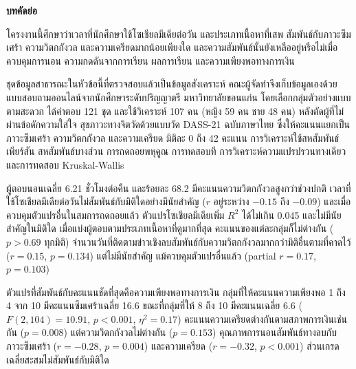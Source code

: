 \thispagestyle{empty}

\begin{center}
    {\fontsize{16pt}{20pt}\selectfont\bfseries บทคัดย่อ\par}
\end{center}

\vspace{1em}


โครงงานนี้ศึกษาว่าเวลาที่นักศึกษาใช้โซเชียลมีเดียต่อวัน และประเภทเนื้อหาที่เสพ
สัมพันธ์กับภาวะซึมเศร้า ความวิตกกังวล และความเครียดมากน้อยเพียงใด
และความสัมพันธ์นั้นยังเหลืออยู่หรือไม่เมื่อควบคุมการนอน ความกดดันจากการเรียน
ผลการเรียน และความเพียงพอทางการเงิน

ชุดข้อมูลสาธารณะในหัวข้อนี้ที่ตรวจสอบแล้วเป็นข้อมูลสังเคราะห์
คณะผู้จัดทำจึงเก็บข้อมูลเองด้วยแบบสอบถามออนไลน์จากนักศึกษาระดับปริญญาตรี มหาวิทยาลัยขอนแก่น
โดยเลือกกลุ่มตัวอย่างแบบตามสะดวก ได้คำตอบ 121 ชุด
และใช้วิเคราะห์ 107 คน (หญิง 59 คน ชาย 48 คน) หลังตัดผู้ที่ไม่ผ่านข้อดักความใส่ใจ
สุขภาวะทางจิตวัดด้วยแบบวัด DASS-21 ฉบับภาษาไทย
ซึ่งให้คะแนนแยกเป็นภาวะซึมเศร้า ความวิตกกังวล และความเครียด มิติละ 0 ถึง 42 คะแนน
การวิเคราะห์ใช้สหสัมพันธ์เพียร์สัน สหสัมพันธ์บางส่วน การถดถอยพหุคูณ การทดสอบที
การวิเคราะห์ความแปรปรวนทางเดียว และการทดสอบ Kruskal-Wallis

ผู้ตอบนอนเฉลี่ย 6.21 ชั่วโมงต่อคืน และร้อยละ 68.2 มีคะแนนความวิตกกังวลสูงกว่าช่วงปกติ
เวลาที่ใช้โซเชียลมีเดียต่อวันไม่สัมพันธ์กับมิติใดอย่างมีนัยสำคัญ
($r$ อยู่ระหว่าง $-0.15$ ถึง $-0.09$) และเมื่อควบคุมตัวแปรอื่นในสมการถดถอยแล้ว
ตัวแปรโซเชียลมีเดียเพิ่ม $R^2$ ได้ไม่เกิน 0.045 และไม่มีนัยสำคัญในมิติใด
เมื่อแบ่งผู้ตอบตามประเภทเนื้อหาที่ดูมากที่สุด คะแนนของแต่ละกลุ่มก็ไม่ต่างกัน ($p > 0.69$ ทุกมิติ)
จำนวนวันที่ติดตามข่าวเชิงลบสัมพันธ์กับความวิตกกังวลมากกว่ามิติอื่นตามที่คาดไว้
($r = 0.15$, $p = 0.134$) แต่ไม่มีนัยสำคัญ แม้ควบคุมตัวแปรอื่นแล้ว
(partial $r = 0.17$,~$p = 0.103$)

ตัวแปรที่สัมพันธ์กับคะแนนชัดที่สุดคือความเพียงพอทางการเงิน
กลุ่มที่ให้คะแนนความเพียงพอ 1 ถึง 4 จาก 10 มีคะแนนซึมเศร้าเฉลี่ย 16.6
ขณะที่กลุ่มที่ให้ 8 ถึง 10 มีคะแนนเฉลี่ย 6.6 ($F(2, 104) = 10.91$, $p < 0.001$, $\eta^2 = 0.17$)
คะแนนความเครียดต่างกันตามสภาพการเงินเช่นกัน ($p = 0.008$) แต่ความวิตกกังวลไม่ต่างกัน ($p = 0.153$)
คุณภาพการนอนสัมพันธ์ทางลบกับภาวะซึมเศร้า ($r = -0.28$, $p = 0.004$)
และความเครียด ($r = -0.32$, $p < 0.001$) ส่วนเกรดเฉลี่ยสะสมไม่สัมพันธ์กับมิติใด

